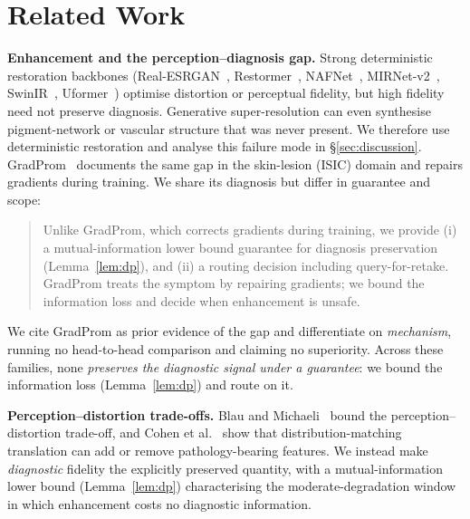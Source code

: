 
\section{Related Work}
\label{sec:related}

\textbf{Enhancement and the perception--diagnosis gap.}
Strong deterministic restoration backbones
(Real-ESRGAN~\citep{wang2021realesrgan}, Restormer~\citep{zamir2022restormer},
NAFNet~\citep{chen2022simple}, MIRNet-v2~\citep{zamir2022mirnetv2},
SwinIR~\citep{liang2021swinir}, Uformer~\citep{wang2022uformer}) optimise
distortion or perceptual fidelity, but high fidelity need not preserve
diagnosis. Generative super-resolution can even synthesise pigment-network or
vascular structure that was never present. We therefore use deterministic
restoration and analyse this failure mode in \S\ref{sec:discussion}. GradProm~\citep{gradprom2025} documents the same
gap in the skin-lesion (ISIC) domain and repairs gradients during training.
We share its diagnosis but differ in guarantee and scope:
\begin{quote}
Unlike GradProm, which corrects gradients during training, we provide (i) a
mutual-information lower bound guarantee for diagnosis preservation
(Lemma~\ref{lem:dp}), and (ii) a routing decision including query-for-retake.
GradProm treats the symptom by repairing gradients; we bound the information
loss and decide when enhancement is unsafe.
\end{quote}
We cite GradProm as prior evidence of the gap and differentiate on
\emph{mechanism}, running no head-to-head comparison and claiming no superiority.
Across these families, none \emph{preserves the diagnostic signal under a
guarantee}: we bound the information loss (Lemma~\ref{lem:dp}) and route on it.

\textbf{Perception--distortion trade-offs.}
Blau and Michaeli~\citep{blau2018perception} bound the perception--distortion
trade-off, and Cohen et al.~\citep{cohen2018distribution} show that
distribution-matching translation can add or remove pathology-bearing features.
We instead make \emph{diagnostic} fidelity the explicitly preserved quantity,
with a mutual-information lower bound (Lemma~\ref{lem:dp}) characterising the
moderate-degradation window in which enhancement costs no diagnostic information.

